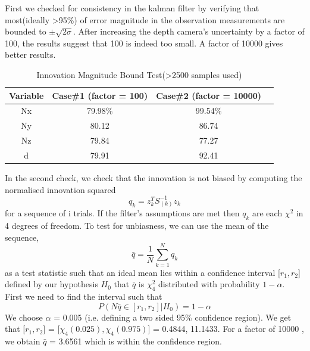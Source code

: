 \documentclass[]{article}
\begin{document}
{First we checked for consistency in the kalman filter by verifying that most(ideally \textgreater 95\%) of error magnitude in the observation measurements are bounded to $\pm\sqrt{2\sigma}$. After increasing the depth camera's uncertainty by a factor of 100, the results suggest that 100 is indeed too small. A factor of 10000 gives better results.


\begin{table}[ht]
\caption{Innovation Magnitude Bound Test(\textgreater 2500 samples used)} %
\centering %
\begin{tabular}{c c c c} %
\hline\hline %
Variable & Case\#1 (factor = 100) & Case\#2 (factor = 10000)  \\ [0.5ex] %
\hline %
    Nx 	& 79.98\% 	& 99.54\%\\
    Ny 	& 80.12 	& 86.74 \\
    Nz 	& 79.84 	& 77.27 \\
    d 	& 79.91 	&	92.41 \\ [1ex] %
\hline %
\end{tabular}
\label{table:firstTest} %
\end{table}
In the second check, we check that the innovation is not biased by computing the normalised innovation squared
\begin{equation}
	q_{k} = z_{k}^{T} S_(k)^{-1} z_{k}
\end{equation}
for a sequence of i trials. If the filter's assumptions are met then $q_{k}$ are each $\chi^{2}$ in 4 degrees of freedom. To test for unbiasness, we can use the mean of the sequence,
\begin{equation}
	\bar{q} = \frac{1}{N}\sum_{k=1}^N {q_k}
\end{equation}
as a test statistic such that an ideal mean lies within a confidence interval [$r_{1}, r_{2}$] defined by our hypothesis $H_0$ that $\bar{q}$ is  $\chi_{4}^{2}$ distributed with probability $1-\alpha$. First we need to find the interval such that
\begin{equation}
P(N\bar{q}\in [r_{1}, r_{2}] | H_{0}) = 1 - \alpha 
\end{equation}
We choose $\alpha$ = 0.005 (i.e. defining a two sided 95\% confidence region). We get that
[$r_{1}, r_{2}$] = [$\chi_{4}(0.025), \chi_{4}(0.975)$] = 0.4844, 11.1433. For a factor of 10000 , we obtain $\bar{q}$ = 3.6561 which is within the confidence region.
}
\end{document}
